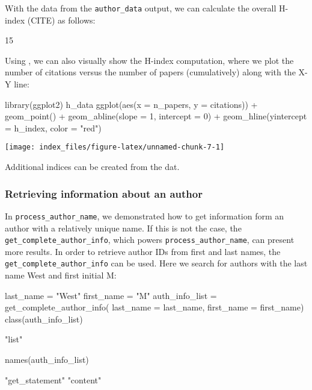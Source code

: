 With the data from the \texttt{author\_data} output, we can calculate
the overall H-index (CITE) as follows:

\begin{Schunk}
\begin{Soutput}
[1] 15
\end{Soutput}
\end{Schunk}

Using , we can also visually show the H-index computation,
where we plot the number of citations versus the number of papers
(cumulatively) along with the X-Y line:

\begin{Schunk}
\begin{Sinput}
library(ggplot2)
h_data %>% 
  ggplot(aes(x = n_papers, y = citations)) + 
  geom_point() + geom_abline(slope = 1, intercept = 0) + 
  geom_hline(yintercept = h_index, color = "red")
\end{Sinput}

\texttt{[image: index\_files/figure-latex/unnamed-chunk-7-1]} \end{Schunk}

Additional indices can be created from the dat.

\hypertarget{retrieving-information-about-an-author}{%
\subsubsection{Retrieving information about an
author}\label{retrieving-information-about-an-author}}

In \texttt{process\_author\_name}, we demonstrated how to get
information form an author with a relatively unique name. If this is not
the case, the \texttt{get\_complete\_author\_info}, which powers
\texttt{process\_author\_name}, can present more results. In order to
retrieve author IDs from first and last names, the
\texttt{get\_complete\_author\_info} can be used. Here we search for
authors with the last name West and first initial M:

\begin{Schunk}
\begin{Sinput}
last_name = "West"
first_name = "M"
auth_info_list = get_complete_author_info(
  last_name = last_name, 
  first_name = first_name)
class(auth_info_list)
\end{Sinput}
\begin{Soutput}
[1] "list"
\end{Soutput}
\begin{Sinput}
names(auth_info_list)
\end{Sinput}
\begin{Soutput}
[1] "get_statement" "content"      
\end{Soutput}
\end{Schunk}

